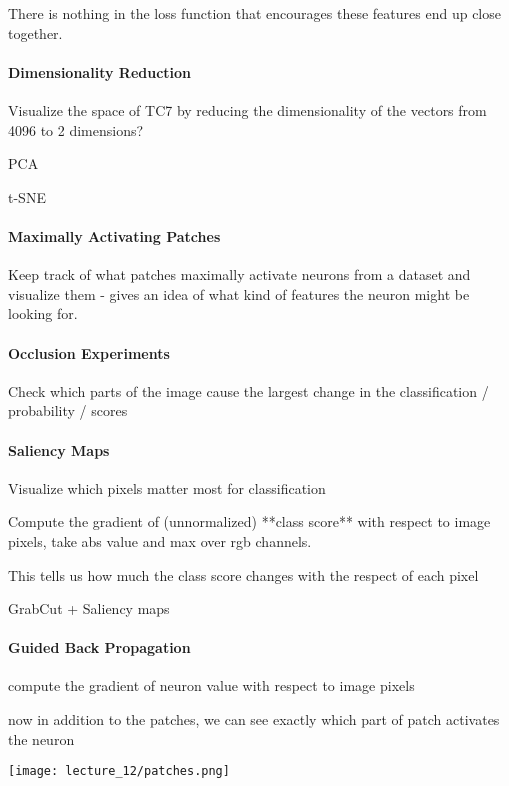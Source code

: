 There is nothing in the loss function that encourages these features end up close together.

\paragraph{Dimensionality Reduction}

Visualize the space of TC7 by reducing the dimensionality of the vectors from 4096 to 2 dimensions?

PCA

t-SNE

\paragraph{Maximally Activating Patches}

Keep track of what patches maximally activate neurons from a dataset and visualize them - gives an idea of what kind of features the neuron might be looking for.

\paragraph{Occlusion Experiments}

Check which parts of the image cause the largest change in the classification / probability / scores

\paragraph{Saliency Maps}

Visualize which pixels matter most for classification

Compute the gradient of (unnormalized) **class score** with respect to image pixels, take abs value and max over rgb channels.

This tells us how much the class score changes with the respect of each pixel

GrabCut + Saliency maps

\paragraph{Guided Back Propagation}

compute the gradient of neuron value with respect to image pixels

now in addition to the patches, we can see exactly which part of patch activates the neuron

\texttt{[image: lecture\_12/patches.png]}

